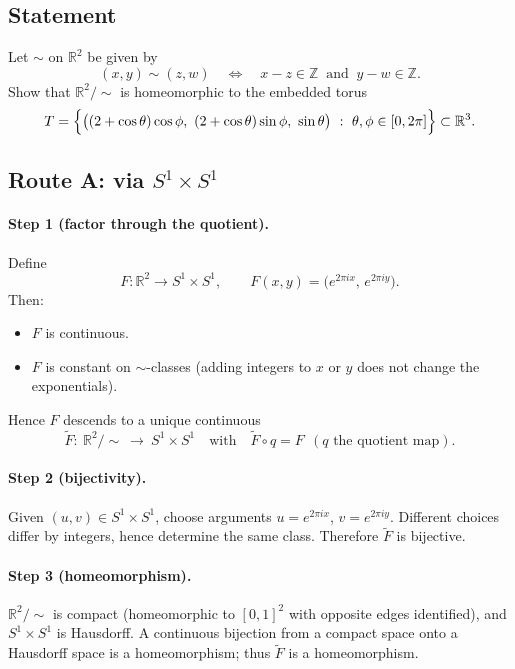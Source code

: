 \documentclass[12pt,a4paper]{article}
\theoremstyle{plain}
\theoremstyle{definition}
\theoremstyle{remark}
\theoremstyle{remark}
\begin{document}
	\subsection*{Statement}
	Let $\sim$ on $\mathbb{R}^2$ be given by
	\[
	(x,y)\sim(z,w)\quad\Longleftrightarrow\quad x-z\in\mathbb{Z}\ \text{ and }\ y-w\in\mathbb{Z}.
	\]
	Show that $\mathbb{R}^2/\!\sim$ is homeomorphic to the embedded torus
	\[
	T=\Bigl\{\bigl((2+\cos\theta)\cos\phi,\ (2+\cos\theta)\sin\phi,\ \sin\theta\bigr)\ :\ \theta,\phi\in[0,2\pi]\Bigr\}\subset\mathbb{R}^3.
	\]
	
	\subsection*{Route A: via $S^1\times S^1$}
	\paragraph{Step 1 (factor through the quotient).}
	Define
	\[
	F:\mathbb{R}^2\longrightarrow S^1\times S^1,\qquad
	F(x,y)=\bigl(e^{2\pi i x},\,e^{2\pi i y}\bigr).
	\]
	Then:
	\begin{itemize}
		\item $F$ is continuous.
		\item $F$ is constant on $\sim$-classes (adding integers to $x$ or $y$ does not change the exponentials).
	\end{itemize}
	Hence $F$ descends to a unique continuous
	\[
	\tilde F:\ \mathbb{R}^2/\!\sim\ \longrightarrow\ S^1\times S^1
	\quad\text{with}\quad
	\tilde F\circ q=F \ \ (q \text{ the quotient map}).
	\]
	
	\paragraph{Step 2 (bijectivity).}
	Given $(u,v)\in S^1\times S^1$, choose arguments $u=e^{2\pi i x}$, $v=e^{2\pi i y}$.
	Different choices differ by integers, hence determine the same class. Therefore $\tilde F$ is bijective.
	
	\paragraph{Step 3 (homeomorphism).}
	$\mathbb{R}^2/\!\sim$ is compact (homeomorphic to $[0,1]^2$ with opposite edges identified), and $S^1\times S^1$ is Hausdorff.
	A continuous bijection from a compact space onto a Hausdorff space is a homeomorphism; thus $\tilde F$ is a homeomorphism.
	
\end{document}
